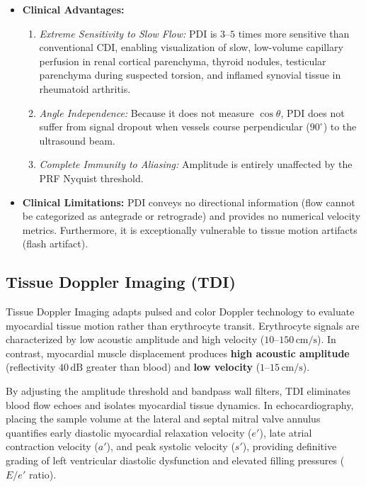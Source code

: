 \documentclass[11pt,a4paper]{article}
\begin{document}
\begin{itemize}[leftmargin=*]
    \item \textbf{Clinical Advantages:}
    \begin{enumerate}
        \item \textit{Extreme Sensitivity to Slow Flow:} PDI is $3\text{--}5$ times more sensitive than conventional CDI, enabling visualization of slow, low-volume capillary perfusion in renal cortical parenchyma, thyroid nodules, testicular parenchyma during suspected torsion, and inflamed synovial tissue in rheumatoid arthritis.
        \item \textit{Angle Independence:} Because it does not measure $\cos\theta$, PDI does not suffer from signal dropout when vessels course perpendicular ($90^\circ$) to the ultrasound beam.
        \item \textit{Complete Immunity to Aliasing:} Amplitude is entirely unaffected by the PRF Nyquist threshold.
    \end{enumerate}
    \item \textbf{Clinical Limitations:} PDI conveys no directional information (flow cannot be categorized as antegrade or retrograde) and provides no numerical velocity metrics. Furthermore, it is exceptionally vulnerable to tissue motion artifacts (flash artifact).
\end{itemize}

\subsection{Tissue Doppler Imaging (TDI)}

Tissue Doppler Imaging adapts pulsed and color Doppler technology to evaluate myocardial tissue motion rather than erythrocyte transit. Erythrocyte signals are characterized by low acoustic amplitude and high velocity ($10\text{--}150\,\text{cm/s}$). In contrast, myocardial muscle displacement produces \textbf{high acoustic amplitude} (reflectivity $40\,\text{dB}$ greater than blood) and \textbf{low velocity} ($1\text{--}15\,\text{cm/s}$).

By adjusting the amplitude threshold and bandpass wall filters, TDI eliminates blood flow echoes and isolates myocardial tissue dynamics. In echocardiography, placing the sample volume at the lateral and septal mitral valve annulus quantifies early diastolic myocardial relaxation velocity ($e'$), late atrial contraction velocity ($a'$), and peak systolic velocity ($s'$), providing definitive grading of left ventricular diastolic dysfunction and elevated filling pressures ($E/e'$ ratio).
\end{document}

